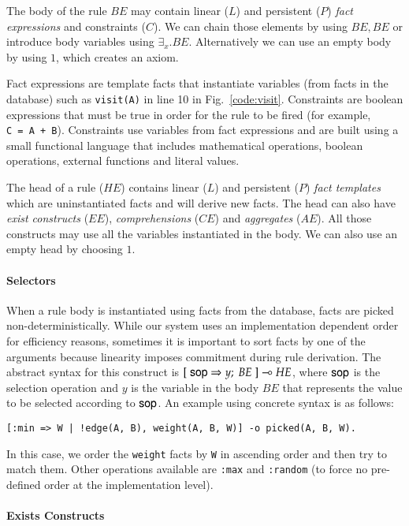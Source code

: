The body of the rule $BE$ may contain linear ($L$) and persistent ($P$) \emph{fact expressions} and
constraints ($C$). We can chain those elements by using $BE, BE$ or introduce body variables using $\exists_{x}. BE$.
Alternatively we can use an empty body by using $1$, which creates an axiom.

Fact expressions are template facts that instantiate variables
(from facts in the database) such as \texttt{visit(A)} in line 10 in Fig.~\ref{code:visit}.
Constraints are boolean expressions that must
be true in order for the rule to be fired (for example, \texttt{C~=~A~+~B}). Constraints use variables from fact expressions and are built using a small functional language that includes mathematical operations, boolean operations, external functions and literal values.

The head of a rule ($HE$) contains linear ($L$) and persistent ($P$) \emph{fact templates} which are uninstantiated facts and will derive new facts. The head can also have \emph{exist constructs} ($EE$), \emph{comprehensions} ($CE$) and \emph{aggregates} ($AE$). All those constructs
may use all the variables instantiated in the body. We can also use an empty head by choosing $1$.

\paragraph{Selectors}

When a rule body is instantiated using facts from the database, facts are picked
non-deterministically. While our system uses an implementation dependent order for
efficiency reasons, sometimes it is important to sort facts by one of the arguments
because linearity imposes commitment during rule derivation. The abstract syntax for
this construct is $[\; \mathsf{sop} \Rightarrow y; \; BE \;] \multimap HE$, where
$\mathsf{sop}$ is the selection operation and $y$ is the variable in the body $BE$ that
represents the value to be selected according to $\mathsf{sop}$.
An example using concrete syntax is as follows:

\begin{Verbatim}
[:min => W | !edge(A, B), weight(A, B, W)] -o picked(A, B, W).
\end{Verbatim}

In this case, we order the \texttt{weight} facts by \texttt{W} in ascending order and then try
to match them. Other operations available are \texttt{:max} and \texttt{:random} (to force no pre-defined order at the
implementation level).

\paragraph{Exists Constructs}

